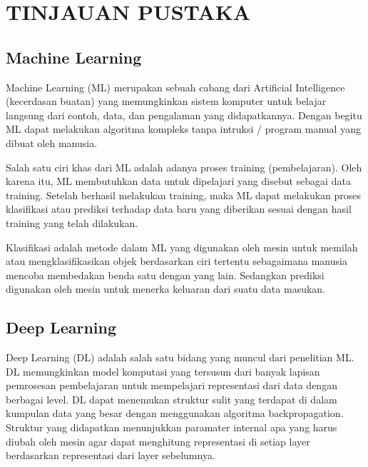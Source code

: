 \chapter{TINJAUAN PUSTAKA}


\section{Machine Learning}


Machine Learning (ML) merupakan sebuah cabang dari Artificial Intelligence (kecerdasan buatan) yang memungkinkan sistem
komputer untuk belajar langsung dari contoh, data, dan pengalaman yang didapatkannya. Dengan begitu ML dapat melakukan algoritma kompleks tanpa intruksi / program manual yang dibuat oleh manusia.

Salah satu ciri khas dari ML adalah adanya proses training (pembelajaran). Oleh karena itu, ML membutuhkan data untuk dipelajari yang disebut sebagai data training. Setelah berhasil melakukan
training, maka ML dapat melakukan proses klasifikasi atau prediksi terhadap data baru yang diberikan sesuai dengan hasil training
yang telah dilakukan.

Klasifikasi adalah metode dalam ML yang digunakan oleh mesin untuk memilah atau mengklasifikasikan objek
berdasarkan ciri tertentu sebagaimana manusia mencoba membedakan benda satu dengan yang lain. Sedangkan prediksi digunakan oleh mesin untuk menerka keluaran dari suatu data
masukan. 

\section{Deep Learning}
Deep Learning (DL) adalah salah satu bidang yang muncul dari penelitian ML.
DL memungkinkan model komputasi yang tersusun dari banyak lapisan pemrosesan pembelajaran untuk mempelajari representasi dari data dengan berbagai level.
DL dapat menemukan struktur sulit yang terdapat di dalam kumpulan data yang besar dengan menggunakan algoritma backpropagation.
Struktur yang didapatkan menunjukkan paramater internal apa yang harus diubah oleh mesin agar dapat menghitung representasi di setiap layer berdasarkan representasi dari layer sebelumnya.

